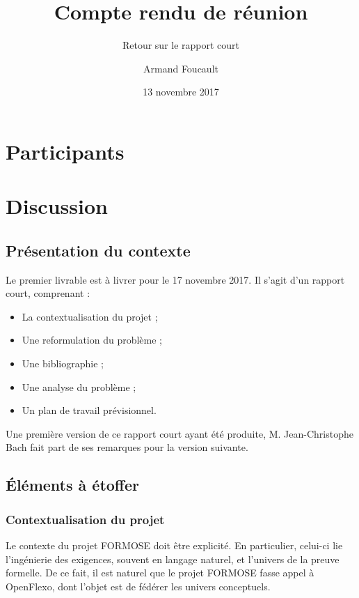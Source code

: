 \documentclass{article}
\author{Armand Foucault}
\date{13 novembre 2017}
\title{Compte rendu de réunion}
\subtitle{Retour sur le rapport court}
\begin{document}
\imtammMaketitle

\section*{Participants}

\begin{imtammActorList}
\item \actorjcbach
\item \actorafoucaul
\end{imtammActorList}


\section*{Discussion}

\subsection*{Présentation du contexte}

Le premier livrable est à livrer pour le 17 novembre 2017.
Il s'agit d'un rapport court, comprenant :

\begin{itemize}
    \item La contextualisation du projet ;
    \item Une reformulation du problème ;
    \item Une bibliographie ;
    \item Une analyse du problème ;
    \item Un plan de travail prévisionnel.
\end{itemize}

Une première version de ce rapport court ayant été produite, M. Jean-Christophe Bach fait part de ses remarques pour la version suivante.

\subsection*{Éléments à étoffer}

\subsubsection*{Contextualisation du projet}

Le contexte du projet FORMOSE doit être explicité.
En particulier, celui-ci lie l'ingénierie des exigences, souvent en langage naturel, et l'univers de la preuve formelle.
De ce fait, il est naturel que le projet FORMOSE fasse appel à OpenFlexo, dont l'objet est de fédérer les univers conceptuels.
\end{document}
